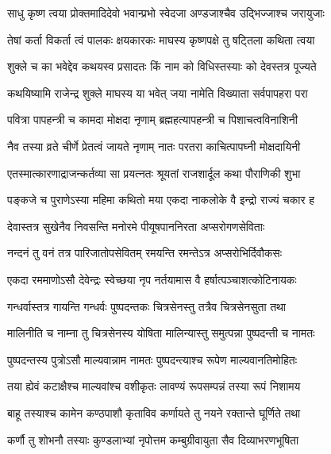 \label{sec:padma-magha-shukla-jaya}



\twolineshloka
{साधु कृष्ण त्वया प्रोक्तमादिदेवो भवान्प्रभो}
{स्वेदजा अण्डजाश्चैव उद्भिज्जाश्च जरायुजाः}%

\twolineshloka
{तेषां कर्ता विकर्ता त्वं पालकः क्षयकारकः}
{माघस्य कृष्णपक्षे तु षट्तिला कथिता त्वया}%

\twolineshloka
{शुक्ले च का भवेद्देव कथयस्व प्रसादतः}
{किं नाम को विधिस्तस्याः को देवस्तत्र पूज्यते}%


\twolineshloka
{कथयिष्यामि राजेन्द्र शुक्ले माघस्य या भवेत्}
{जया नामेति विख्याता सर्वपापहरा परा}%

\twolineshloka
{पवित्रा पापहन्त्री च कामदा मोक्षदा नृणाम्}
{ब्रह्महत्यापहन्त्री च पिशाचत्वविनाशिनी}%

\twolineshloka
{नैव तस्या व्रते चीर्णे प्रेतत्वं जायते नृणाम्}
{नातः परतरा काचित्पापघ्नी मोक्षदायिनी}%

\twolineshloka
{एतस्मात्कारणाद्राजन्कर्तव्या सा प्रयत्नतः}
{श्रूयतां राजशार्दूल कथा पौराणिकी शुभा}%

\twolineshloka
{पङ्कजे च पुराणेऽस्या महिमा कथितो मया}
{एकदा नाकलोके वै इन्द्रो राज्यं चकार ह}%

\twolineshloka
{देवास्तत्र सुखेनैव निवसन्ति मनोरमे}
{पीयूषपाननिरता अप्सरोगणसेविताः}%

\twolineshloka
{नन्दनं तु वनं तत्र पारिजातोपसेवितम्}
{रमयन्ति रमन्तेऽत्र अप्सरोभिर्दिवौकसः}%

\twolineshloka
{एकदा रममाणोऽसौ देवेन्द्रः स्वेच्छया नृप}
{नर्तयामास वै हर्षात्पञ्चाशत्कोटिनायकः}%

\twolineshloka
{गन्धर्वास्तत्र गायन्ति गन्धर्वः पुष्पदन्तकः}
{चित्रसेनस्तु तत्रैव चित्रसेनसुता तथा}%

\twolineshloka
{मालिनीति च नाम्ना तु चित्रसेनस्य योषिता}
{मालिन्यास्तु समुत्पन्ना पुष्पदन्ती च नामतः}%

\twolineshloka
{पुष्पदन्तस्य पुत्रोऽसौ माल्यवान्नाम नामतः}
{पुष्पदन्त्याश्च रूपेण माल्यवानतिमोहितः}%

\twolineshloka
{तया ह्येवं कटाक्षैश्च माल्यवांश्च वशीकृतः}
{लावण्यं रूपसम्पन्नं तस्या रूपं निशामय}%

\twolineshloka
{बाहू तस्याश्च कामेन कण्ठपाशौ कृताविव}
{कर्णायते तु नयने रक्तान्ते घूर्णिते तथा}%

\twolineshloka
{कर्णौ तु शोभनौ तस्याः कुण्डलाभ्यां नृपोत्तम}
{कम्बुग्रीवायुता सैव दिव्याभरणभूषिता}%

